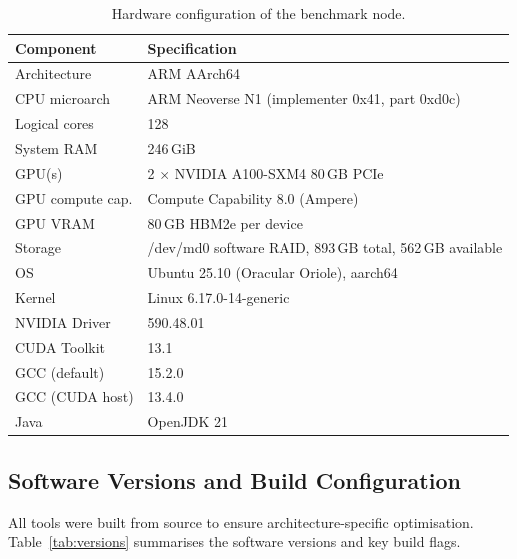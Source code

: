 \documentclass[a4paper,12pt]{article}
\begin{document}
\begin{table}[H]
  \centering
  \caption{Hardware configuration of the benchmark node.}
  \label{tab:hardware}
  \begin{tabular}{ll}
    \toprule
    \textbf{Component} & \textbf{Specification} \\
    \midrule
    Architecture       & ARM AArch64 \\
    CPU microarch      & ARM Neoverse N1 (implementer 0x41, part 0xd0c) \\
    Logical cores      & 128 \\
    System RAM         & 246\,GiB \\
    GPU(s)             & 2 $\times$ NVIDIA A100-SXM4 80\,GB PCIe \\
    GPU compute cap.   & Compute Capability 8.0 (Ampere) \\
    GPU VRAM           & 80\,GB HBM2e per device \\
    Storage            & /dev/md0 software RAID, 893\,GB total, 562\,GB available \\
    \midrule
    OS                 & Ubuntu 25.10 (Oracular Oriole), aarch64 \\
    Kernel             & Linux 6.17.0-14-generic \\
    NVIDIA Driver      & 590.48.01 \\
    CUDA Toolkit       & 13.1 \\
    GCC (default)      & 15.2.0 \\
    GCC (CUDA host)    & 13.4.0 \\
    Java               & OpenJDK 21 \\
    \bottomrule
  \end{tabular}
\end{table}

\subsection{Software Versions and Build Configuration}

All tools were built from source to ensure architecture-specific optimisation.
Table~\ref{tab:versions} summarises the software versions and key build flags.
\end{document}
